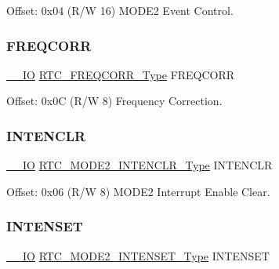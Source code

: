 Offset\+: 0x04 (R/W 16) M\+O\+D\+E2 Event Control. 

\mbox{\label{struct_rtc_mode2_a6895b43aadf5f05e11817146109d789a}} 
\subsubsection{\texorpdfstring{FREQCORR}{FREQCORR}}
{\footnotesize\ttfamily \mbox{\hyperlink{core__cm0plus_8h_aec43007d9998a0a0e01faede4133d6be}{\+\_\+\+\_\+\+IO}} \mbox{\hyperlink{union_r_t_c___f_r_e_q_c_o_r_r___type}{R\+T\+C\+\_\+\+F\+R\+E\+Q\+C\+O\+R\+R\+\_\+\+Type}} F\+R\+E\+Q\+C\+O\+RR}



Offset\+: 0x0C (R/W 8) Frequency Correction. 

\mbox{\label{struct_rtc_mode2_a8439b201b6495b35f3619e901cf35a63}} 
\subsubsection{\texorpdfstring{INTENCLR}{INTENCLR}}
{\footnotesize\ttfamily \mbox{\hyperlink{core__cm0plus_8h_aec43007d9998a0a0e01faede4133d6be}{\+\_\+\+\_\+\+IO}} \mbox{\hyperlink{union_r_t_c___m_o_d_e2___i_n_t_e_n_c_l_r___type}{R\+T\+C\+\_\+\+M\+O\+D\+E2\+\_\+\+I\+N\+T\+E\+N\+C\+L\+R\+\_\+\+Type}} I\+N\+T\+E\+N\+C\+LR}



Offset\+: 0x06 (R/W 8) M\+O\+D\+E2 Interrupt Enable Clear. 

\mbox{\label{struct_rtc_mode2_a80f57e7f64955acb2e16970997fa5d7f}} 
\subsubsection{\texorpdfstring{INTENSET}{INTENSET}}
{\footnotesize\ttfamily \mbox{\hyperlink{core__cm0plus_8h_aec43007d9998a0a0e01faede4133d6be}{\+\_\+\+\_\+\+IO}} \mbox{\hyperlink{union_r_t_c___m_o_d_e2___i_n_t_e_n_s_e_t___type}{R\+T\+C\+\_\+\+M\+O\+D\+E2\+\_\+\+I\+N\+T\+E\+N\+S\+E\+T\+\_\+\+Type}} I\+N\+T\+E\+N\+S\+ET}



